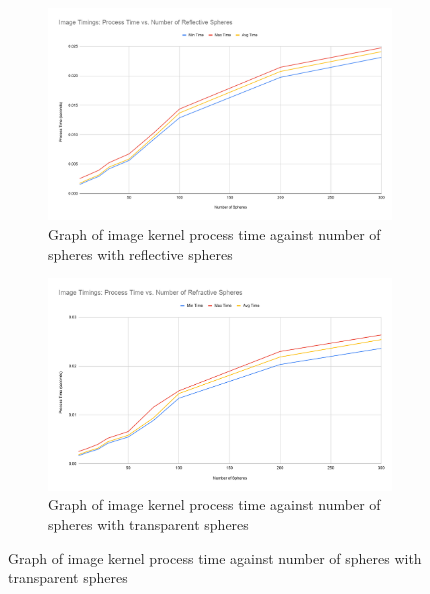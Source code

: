 \documentclass[final]{cmpreport}
\begin{document}
\begin{figure}
    \centering
    \begin{subfigure}{0.5\textwidth}
        \centering
        \includegraphics[width=\linewidth]{img/Image Timings Process Time vs. Number of Reflective Spheres.png}
        \caption{Graph of image kernel process time against number of spheres with reflective spheres}
        \label{graphreflectspheresimagekernel}
    \end{subfigure}%
    \begin{subfigure}{0.5\textwidth}
        \centering
        \includegraphics[width=\linewidth]{img/Image Timings Process Time vs. Number of Refractive Spheres.png}
        \caption{Graph of image kernel process time against number of spheres with transparent spheres}
        \label{graphglasssphereimagekernel}
    \end{subfigure}
\end{figure}
\end{document}
